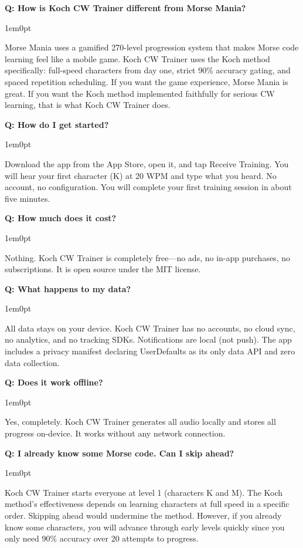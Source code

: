 \documentclass[11pt,letterpaper]{article}
\newenvironment{faqpair}[1]{%
  \vspace{0.5em}%
  \noindent\textbf{\color{SectionBlue}Q: #1}\par%
  \vspace{0.2em}%
  \begin{adjustwidth}{1em}{0pt}%
  \setlength{\parindent}{0pt}%
}{%
  \end{adjustwidth}%
  \vspace{0.5em}%
}
\begin{document}
\begin{faqpair}{How is Koch CW Trainer different from Morse Mania?}
  Morse Mania uses a gamified 270-level progression system that makes Morse code learning feel like a mobile game. Koch CW Trainer uses the Koch method specifically: full-speed characters from day one, strict 90\% accuracy gating, and spaced repetition scheduling. If you want the game experience, Morse Mania is great. If you want the Koch method implemented faithfully for serious CW learning, that is what Koch CW Trainer does.
\end{faqpair}

\begin{faqpair}{How do I get started?}
  Download the app from the App Store, open it, and tap Receive Training. You will hear your first character (K) at 20 WPM and type what you heard. No account, no configuration. You will complete your first training session in about five minutes.
\end{faqpair}

\begin{faqpair}{How much does it cost?}
  Nothing. Koch CW Trainer is completely free---no ads, no in-app purchases, no subscriptions. It is open source under the MIT license.
\end{faqpair}

\begin{faqpair}{What happens to my data?}
  All data stays on your device. Koch CW Trainer has no accounts, no cloud sync, no analytics, and no tracking SDKs. Notifications are local (not push). The app includes a privacy manifest declaring UserDefaults as its only data API and zero data collection.
\end{faqpair}

\begin{faqpair}{Does it work offline?}
  Yes, completely. Koch CW Trainer generates all audio locally and stores all progress on-device. It works without any network connection.
\end{faqpair}

\begin{faqpair}{I already know some Morse code. Can I skip ahead?}
  Koch CW Trainer starts everyone at level 1 (characters K and M). The Koch method's effectiveness depends on learning characters at full speed in a specific order. Skipping ahead would undermine the method. However, if you already know some characters, you will advance through early levels quickly since you only need 90\% accuracy over 20 attempts to progress.
\end{faqpair}
\end{document}
